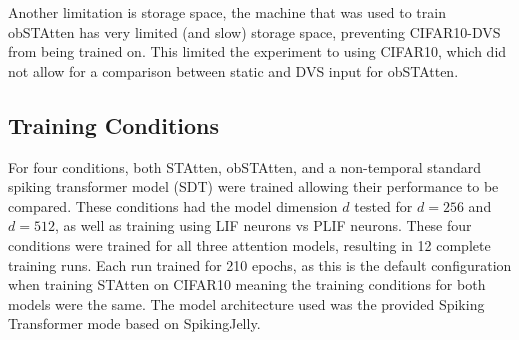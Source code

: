 \documentclass[../main.tex]{subfiles}
\begin{document}
\par Another limitation is storage space, the machine that was used to train obSTAtten has very limited (and slow) storage space, preventing CIFAR10-DVS from being trained on. This limited the experiment to using CIFAR10, which did not allow for a comparison between static and DVS input for obSTAtten.

\subsection{Training Conditions}
For four conditions, both STAtten, obSTAtten, and a non-temporal standard spiking transformer model (SDT) were trained allowing their performance to be compared. These conditions had the model dimension $d$ tested for $d=256$ and $d=512$, as well as training using LIF neurons vs PLIF neurons. These four conditions were trained for all three attention models, resulting in 12 complete training runs. Each run trained for 210 epochs, as this is the default configuration when training STAtten on CIFAR10 meaning the training conditions for both models were the same. The model architecture used was the provided Spiking Transformer mode based on SpikingJelly\cite{STAtten}\cite{spikingjelly}.
\end{document}
